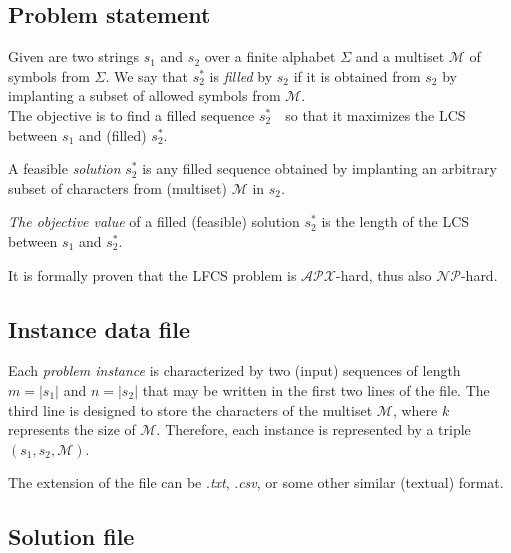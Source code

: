 \documentclass[]{article}
\begin{document}

\subsection{Problem statement}

Given are two strings $s_1$ and $s_2$ over a finite alphabet $\Sigma$ and a multiset $\mathcal{M}$ of symbols from $\Sigma$. We say that $s_2^*$ is \textit{filled} by $s_2$ if it is obtained from $s_2$ by implanting a subset of allowed symbols from $\mathcal{M}$.  \\
The objective is to find a filled sequence $s_2^*$\ \ so that it maximizes the LCS between $s_1$ and (filled) $s_2^*$. 

A feasible \textit{solution} $s_2^*$ is any filled sequence obtained by implanting an arbitrary subset of characters from (multiset) $\mathcal{M}$ in $s_2$. 

\textit{The objective value} of a filled (feasible) solution $s_2^*$ is the length of the LCS  between $s_1$ and $s_2^*$. 

It is formally proven that the LFCS problem is $\mathcal{APX}$-hard, thus also $\mathcal{NP}$-hard. 


\subsection{Instance data file}


Each \textit{problem instance} is characterized by two (input) sequences of length $m=|s_1|$ and $n=|s_2|$ that may be written in the first two lines of the file.  The third line is designed to store the characters of the multiset $\mathcal{M}$, where $k$ represents the size of $\mathcal{M}$. Therefore, each instance is represented by a triple $(s_1, s_2, \mathcal{M})$. 

The extension of the file can be .\textit{txt}, .\textit{csv}, or some other similar (textual) format.

\subsection{Solution file}
\end{document}
